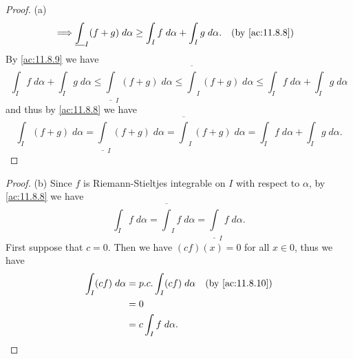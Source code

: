 \begin{proof}{(a)}
\begin{align*}
    \implies & \underline{\int}_I (f + g) \; d \alpha \geq \int_I f \; d \alpha + \int_I g \; d \alpha.                        &   & \text{(by \cref{ac:11.8.8})}
  \end{align*}
  By \cref{ac:11.8.9} we have
  \[
    \int_I f \; d \alpha + \int_I g \; d \alpha \leq \underline{\int}_I (f + g) \; d \alpha \leq \overline{\int}_I (f + g) \; d \alpha \leq \int_I f \; d \alpha + \int_I g \; d \alpha
  \]
  and thus by \cref{ac:11.8.8} we have
  \[
    \int_I (f + g) \; d \alpha = \underline{\int}_I (f + g) \; d \alpha = \overline{\int}_I (f + g) \; d \alpha = \int_I f \; d \alpha + \int_I g \; d \alpha.
  \]
\end{proof}

\begin{proof}{(b)}
  Since \(f\) is Riemann-Stieltjes integrable on \(I\) with respect to \(\alpha\), by \cref{ac:11.8.8} we have
  \[
    \int_I f \; d \alpha = \overline{\int}_I f \; d \alpha = \underline{\int}_I f \; d \alpha.
  \]
  First suppose that \(c = 0\).
  Then we have \((cf)(x) = 0\) for all \(x \in 0\), thus we have
  \begin{align*}
    \int_I (cf) \; d \alpha & = p.c. \int_I (cf) \; d \alpha &  & \text{(by \cref{ac:11.8.10})} \\
                            & = 0                                                               \\
                            & = c \int_I f \; d \alpha.
  \end{align*}


\end{proof}
